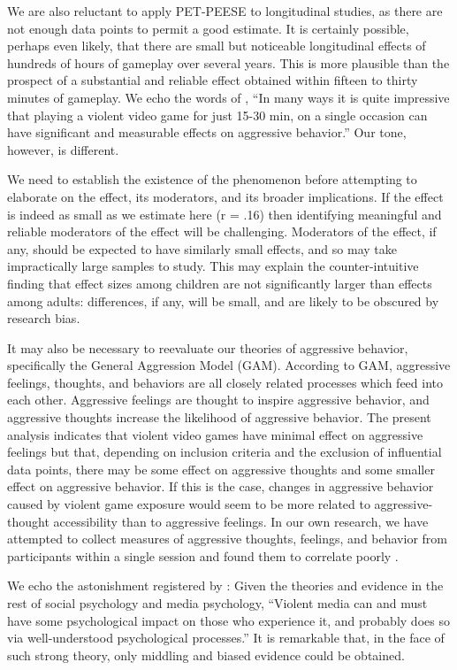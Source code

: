 \documentclass[man]{apa6}
\begin{document}
We are also reluctant to apply PET-PEESE to longitudinal studies, as there are not enough data points to permit a good estimate. It is certainly possible, perhaps even likely, that there are small but noticeable longitudinal effects of hundreds of hours of gameplay over several years. This is more plausible than the prospect of a substantial and reliable effect obtained within fifteen to thirty minutes of gameplay. We echo the words of \citet[p. 51]{Bushman:Huesmann:2014}, ``In many ways it is quite impressive that playing a violent video game for just 15-30 min, on a single occasion can have significant and measurable effects on aggressive behavior.'' Our tone, however, is different.

We need to establish the existence of the phenomenon before attempting to elaborate on the effect, its moderators, and its broader implications. If the effect is indeed as small as we estimate here (r = .16) then identifying meaningful and reliable moderators of the effect will be challenging.  Moderators of the effect, if any, should be expected to have similarly small effects, and so may take impractically large samples to study. This may explain the counter-intuitive finding that effect sizes among children are not significantly larger than effects among adults: differences, if any, will be small, and are likely to be obscured by research bias. 

It may also be necessary to reevaluate our theories of aggressive behavior, specifically the General Aggression Model (GAM). According to GAM, aggressive feelings, thoughts, and behaviors are all closely related processes which feed into each other. Aggressive feelings are thought to inspire aggressive behavior, and aggressive thoughts increase the likelihood of aggressive behavior. The present analysis indicates that violent video games have minimal effect on aggressive feelings \citep[a finding paralleled by][]{Przybylski:etal:2014} but that, depending on inclusion criteria and the exclusion of influential data points, there may be some effect on aggressive thoughts and some smaller effect on aggressive behavior. If this is the case, changes in aggressive behavior caused by violent game exposure would seem to be more related to aggressive-thought accessibility than to aggressive feelings. In our own research, we have attempted to collect measures of aggressive thoughts, feelings, and behavior from participants within a single session and found them to correlate poorly \citep{Engelhardt:etal:2015}.

We echo the astonishment registered by \citet[p. 62]{Warburton:2014}: Given the theories and evidence in the rest of social psychology and media psychology, ``Violent media can and must have some psychological impact on those who experience it, and probably does so via well-understood psychological processes.'' It is remarkable that, in the face of such strong theory, only middling and biased evidence could be obtained. 
\end{document}
